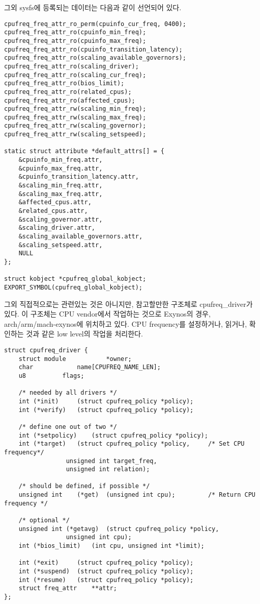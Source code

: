 \vspace{\baselineskip}

그외 sysfs에 등록되는 데이터는 다음과 같이 선언되어 있다. 
\begin{lstlisting}
cpufreq_freq_attr_ro_perm(cpuinfo_cur_freq, 0400);
cpufreq_freq_attr_ro(cpuinfo_min_freq);
cpufreq_freq_attr_ro(cpuinfo_max_freq);
cpufreq_freq_attr_ro(cpuinfo_transition_latency);
cpufreq_freq_attr_ro(scaling_available_governors);
cpufreq_freq_attr_ro(scaling_driver);
cpufreq_freq_attr_ro(scaling_cur_freq);
cpufreq_freq_attr_ro(bios_limit);
cpufreq_freq_attr_ro(related_cpus);
cpufreq_freq_attr_ro(affected_cpus);
cpufreq_freq_attr_rw(scaling_min_freq);
cpufreq_freq_attr_rw(scaling_max_freq);
cpufreq_freq_attr_rw(scaling_governor); 
cpufreq_freq_attr_rw(scaling_setspeed);

static struct attribute *default_attrs[] = {
    &cpuinfo_min_freq.attr,
    &cpuinfo_max_freq.attr,
    &cpuinfo_transition_latency.attr,
    &scaling_min_freq.attr,
    &scaling_max_freq.attr,
    &affected_cpus.attr,
    &related_cpus.attr,
    &scaling_governor.attr,
    &scaling_driver.attr,
    &scaling_available_governors.attr,
    &scaling_setspeed.attr,
    NULL
};

struct kobject *cpufreq_global_kobject;
EXPORT_SYMBOL(cpufreq_global_kobject);
\end{lstlisting}

\vspace{\baselineskip}

그외 직접적으로는 관련있는 것은 아니지만, 참고할만한 구조체로 cpufreq\_driver가 있다. 
이 구조체는 CPU vendor에서 작업하는 것으로 Exynos의 경우, arch/arm/mach-exynos에 위치하고 있다. 
CPU frequency를 설정하거나, 읽거나, 확인하는 것과 같은 low level의 작업을 처리한다. 
\begin{lstlisting}
struct cpufreq_driver {
    struct module           *owner;
    char            name[CPUFREQ_NAME_LEN];
    u8          flags;
                     
    /* needed by all drivers */
    int (*init)     (struct cpufreq_policy *policy);
    int (*verify)   (struct cpufreq_policy *policy);
    
    /* define one out of two */
    int (*setpolicy)    (struct cpufreq_policy *policy);
    int (*target)   (struct cpufreq_policy *policy,     /* Set CPU frequency*/
                 unsigned int target_freq,
                 unsigned int relation);

    /* should be defined, if possible */
    unsigned int    (*get)  (unsigned int cpu);         /* Return CPU frequency */

    /* optional */
    unsigned int (*getavg)  (struct cpufreq_policy *policy,
                 unsigned int cpu);
    int (*bios_limit)   (int cpu, unsigned int *limit);

    int (*exit)     (struct cpufreq_policy *policy);
    int (*suspend)  (struct cpufreq_policy *policy);
    int (*resume)   (struct cpufreq_policy *policy);
    struct freq_attr    **attr;
};  
\end{lstlisting}



